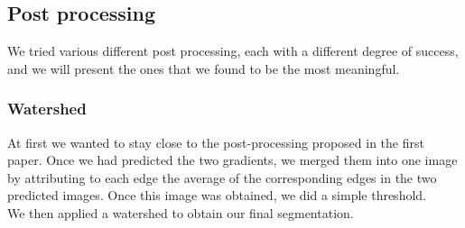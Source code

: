 \subsection{Post processing}

We tried various different post processing, each with a different degree of
success, and we will present the ones that we found to be the most meaningful.

\subsubsection{Watershed}

At first we wanted to stay close to the post-processing proposed in the first paper.
Once we had predicted the two gradients, we merged them into one image by
attributing to each edge the average of the corresponding edges in the two
predicted images. Once this image was obtained, we did a simple threshold.\\
We then applied a watershed to obtain our final segmentation.\\


